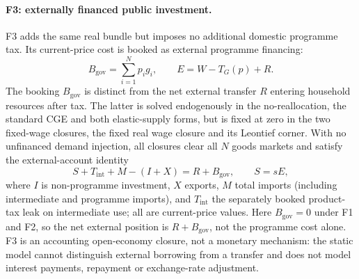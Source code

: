 \paragraph{F3: externally financed public investment.}
F3 adds the same real bundle but imposes no additional domestic programme
tax. Its current-price cost is booked as external programme financing:
\begin{equation}
B_{\mathrm{gov}} = \sum_{i=1}^N p_i g_i,
\qquad E = W-T_G(p)+R.
\label{eq:closure-f3}
\end{equation}
The booking $B_{\mathrm{gov}}$ is distinct from the net external transfer
$R$ entering household resources after tax. The latter is solved
endogenously in the no-reallocation, the standard CGE and both
elastic-supply forms, but is fixed at zero in the two fixed-wage closures,
the fixed real wage closure and its Leontief corner. With no unfinanced
demand injection, all closures clear
all $N$ goods markets and satisfy the external-account identity
\begin{equation}
S + T_{\mathrm{int}} + M - (I+X) = R+B_{\mathrm{gov}},
\qquad S=sE,
\label{eq:financing-external-account}
\end{equation}
where $I$ is non-programme investment, $X$ exports, $M$ total imports
(including intermediate and programme imports), and $T_{\mathrm{int}}$
the separately booked product-tax leak on intermediate use; all are
current-price values. Here $B_{\mathrm{gov}}=0$ under F1 and F2, so the net
external position is $R+B_{\mathrm{gov}}$, not the programme cost alone.
F3 is an accounting open-economy closure, not a monetary mechanism: the
static model cannot distinguish external borrowing from a transfer and
does not model interest payments, repayment or exchange-rate adjustment.
\endgroup
